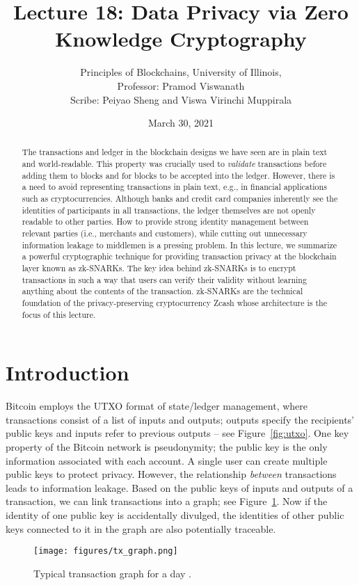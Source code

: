 \documentclass[a4paper]{article}
\title{Lecture 18: Data Privacy via Zero Knowledge Cryptography	}
\author{
Principles of Blockchains, University of Illinois, \\ 
Professor: Pramod Viswanath \\ 
Scribe: Peiyao Sheng 
 and Viswa Virinchi Muppirala\\
}
\date{March 30, 2021}
\begin{document}
\maketitle

\begin{abstract}
   The transactions and ledger in the blockchain designs we have seen are in plain text and world-readable. This property was crucially used to {\em validate} transactions before adding them to blocks and for blocks to be accepted into the ledger. However, there is a need to avoid representing transactions in plain text, e.g., in financial applications such as cryptocurrencies. Although banks and credit card companies inherently see the identities of participants in all transactions, the ledger themselves are not openly readable to other parties. How to provide strong identity management between relevant parties (i.e., merchants and customers), while cutting out unnecessary information leakage to middlemen is a pressing problem.  In this lecture, we 
    summarize a powerful cryptographic technique for providing transaction privacy at the blockchain layer known as zk-SNARKs. The key idea behind zk-SNARKs is to encrypt transactions in such a way that users can verify their validity without learning anything about the contents of the transaction. zk-SNARKs are the technical foundation of the privacy-preserving cryptocurrency Zcash whose architecture is the focus of this lecture. 
\end{abstract}

\section*{Introduction}
Bitcoin employs the UTXO format of state/ledger management, where transactions consist of a list of inputs and outputs;  outputs specify the recipients' public keys and inputs refer to previous outputs -- see  Figure~\ref{fig:utxo}. One key property of the Bitcoin network is pseudonymity;  the public key is the only information associated with each account. A single user can create multiple public keys to protect privacy. However, the relationship {\em between} transactions leads to information leakage. Based on the public keys of inputs and outputs of a transaction, we can link  transactions into a  graph; see Figure~\ref{fig:spill}. Now if the identity of one  public key is accidentally divulged, the identities of other public keys connected to it in the graph are also potentially traceable.

\begin{figure}
    \centering
    \texttt{[image: figures/tx\_graph.png]}
    \caption{Typical transaction graph for a day \cite{fleder2015bitcoin}.}
    \label{fig:spill}
\end{figure}
\end{document}
